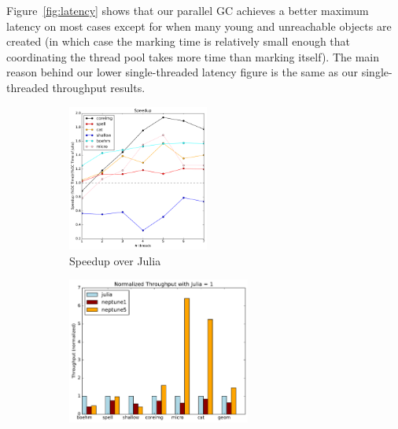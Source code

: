Figure~\ref{fig:latency} shows that our parallel GC achieves a better maximum latency on most cases except for when many young and unreachable objects are created (in which case the marking time is relatively small enough that coordinating the thread pool takes more time than marking itself).
The main reason behind our lower single-threaded latency figure is the same as our single-threaded throughput results.

\begin{figure}[h]
  \centering
    \begin{subfigure}{0.28\textwidth}
      \centering
      \includegraphics[height=4.8cm]{figures/speedup-julia.pdf}
      \caption{Speedup over Julia}
      \label{fig:speedup}
    \end{subfigure}
    \begin{subfigure}{0.34\textwidth}
      \centering
      \includegraphics[height=4.8cm]{figures/throughput-normalized-julia.pdf}
      

\end{subfigure}
\end{figure}
